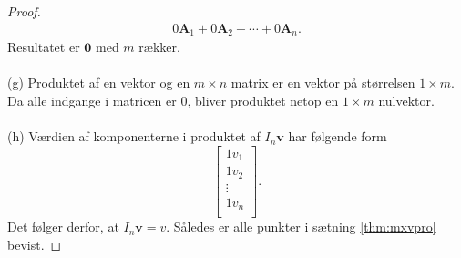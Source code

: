 \begin{proof}
\begin{align*}
0\textbf{A}_1+0\textbf{A}_2+\cdots+0\textbf{A}_n.
\end{align*}
Resultatet er $\textbf{0}$ med $m$ rækker. \\\\
(g)
Produktet af en vektor og en $m \times n$ matrix er en vektor på størrelsen $1 \times m$. Da alle indgange i matricen er $0$, bliver produktet netop en $1 \times m$ nulvektor. 
\\\\
(h)
Værdien af komponenterne i produktet af $I_n\mathbf{v}$ har følgende form 
$$
\begin{bmatrix}
1v_1 \\
1v_2 \\
\vdots \\
1v_n  \\
\end{bmatrix}.
$$
Det følger derfor, at $I_n\mathbf{v}=v$.
Således er alle punkter i sætning \ref{thm:mxvpro} bevist. 
\end{proof}